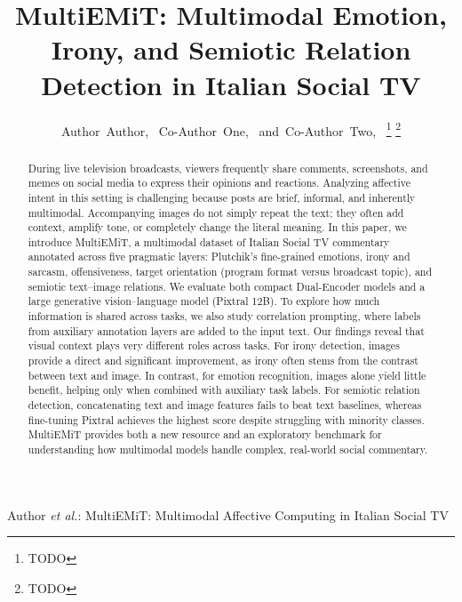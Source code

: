 \documentclass[letterpaper,journal]{IEEEtran}
\begin{document}
\title{MultiEMiT: Multimodal Emotion, Irony, and Semiotic Relation Detection in Italian Social TV}

\author{Author~Author,~
        Co-Author~One,~
        and~Co-Author~Two,~%
\thanks{TODO}%
\thanks{TODO}}

%
{Author \MakeLowercase{\textit{et al.}}: MultiEMiT: Multimodal Affective Computing in Italian Social TV}

\maketitle

\begin{abstract}
During live television broadcasts, viewers frequently share comments, screenshots, and memes on social media to express their opinions and reactions. Analyzing affective intent in this setting is challenging because posts are brief, informal, and inherently multimodal. Accompanying images do not simply repeat the text; they often add context, amplify tone, or completely change the literal meaning. In this paper, we introduce MultiEMiT, a multimodal dataset of Italian Social TV commentary annotated across five pragmatic layers: Plutchik's fine-grained emotions, irony and sarcasm, offensiveness, target orientation (program format versus broadcast topic), and semiotic text--image relations. We evaluate both compact Dual-Encoder models and a large generative vision--language model (Pixtral 12B). To explore how much information is shared across tasks, we also study correlation prompting, where labels from auxiliary annotation layers are added to the input text. Our findings reveal that visual context plays very different roles across tasks. For irony detection, images provide a direct and significant improvement, as irony often stems from the contrast between text and image. In contrast, for emotion recognition, images alone yield little benefit, helping only when combined with auxiliary task labels. For semiotic relation detection, concatenating text and image features fails to beat text baselines, whereas fine-tuning Pixtral achieves the highest score despite struggling with minority classes. MultiEMiT provides both a new resource and an exploratory benchmark for understanding how multimodal models handle complex, real-world social commentary.
\end{abstract}
\end{document}
